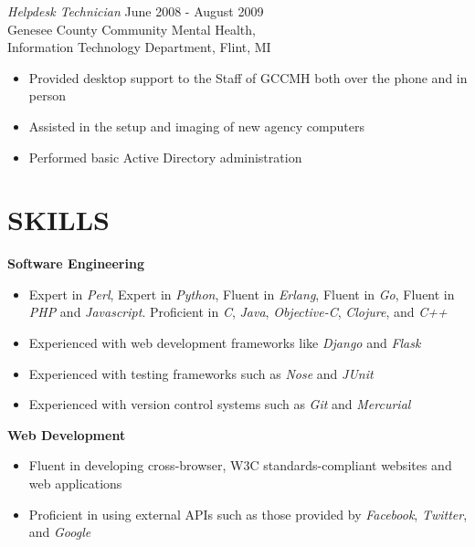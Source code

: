 \documentclass[line,margin]{res}
\begin{document}
\begin{resume}
    {\sl Helpdesk Technician}
            \hfill June 2008 - August 2009 \\
                   Genesee County Community Mental Health, \\
                   Information Technology Department, Flint, MI
        \begin{itemize}
            \item Provided desktop support to the Staff of GCCMH both
                  over the phone and in person
            \item Assisted in the setup and imaging of new agency
                  computers
            \item Performed basic Active Directory administration
        \end{itemize}


\section{SKILLS}
    \textbf{Software Engineering}
    \begin{itemize}
        \item Expert in {\sl Perl},
              Expert in {\sl Python},
              Fluent in {\sl Erlang},
              Fluent in {\sl Go},
              Fluent in {\sl PHP} and {\sl Javascript}.
              Proficient in {\sl C}, {\sl Java}, {\sl Objective-C},
                {\sl Clojure}, and {\sl C++}
        \item Experienced with web development frameworks like {\sl Django}
              and {\sl Flask}
        \item Experienced with testing frameworks such as {\sl Nose} and {\sl JUnit}
        \item Experienced with version control systems such as {\sl Git} and {\sl Mercurial}
    \end{itemize}

    \textbf{Web Development}
    \begin{itemize}
        \item Fluent in developing cross-browser, W3C standards-compliant websites
              and web applications
        \item Proficient in using external APIs such as those provided by {\sl Facebook},
              {\sl Twitter}, and {\sl Google}
    \end{itemize}


\end{resume}
\end{document}
